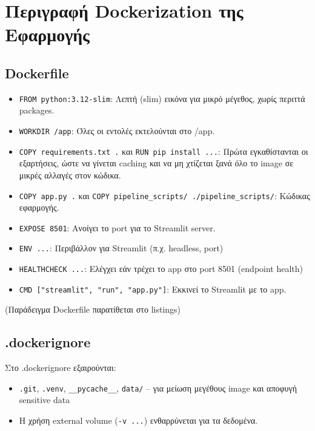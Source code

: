 \documentclass[12pt, a4paper]{article}
\begin{document}
\section{Περιγραφή Dockerization της Εφαρμογής}
\label{sec:dockerization}
\subsection{Dockerfile}
\begin{itemize}
    \item \texttt{FROM python:3.12-slim}: Λεπτή (slim) εικόνα για μικρό μέγεθος, χωρίς περιττά packages.
    \item \texttt{WORKDIR /app}: Όλες οι εντολές εκτελούνται στο /app.
    \item \texttt{COPY requirements.txt .} και \texttt{RUN pip install ...}: Πρώτα εγκαθίστανται οι εξαρτήσεις, ώστε να γίνεται caching και να μη χτίζεται ξανά όλο το image σε μικρές αλλαγές στον κώδικα.
    \item \texttt{COPY app.py .} και \texttt{COPY pipeline\_scripts/ ./pipeline\_scripts/}: Κώδικας εφαρμογής.
    \item \texttt{EXPOSE 8501}: Ανοίγει το port για το Streamlit server.
    \item \texttt{ENV ...}: Περιβάλλον για Streamlit (π.χ. headless, port)
    \item \texttt{HEALTHCHECK ...}: Ελέγχει εάν τρέχει το app στο port 8501 (endpoint health)
    \item \texttt{CMD ["streamlit", "run", "app.py"]}: Εκκινεί το Streamlit με το app.
\end{itemize}

(Παράδειγμα Dockerfile παρατίθεται στο listings)

\subsection{.dockerignore}
Στο .dockerignore εξαιρούνται:
\begin{itemize}
    \item \texttt{.git}, \texttt{.venv}, \texttt{\_\_pycache\_\_}, \texttt{data/} -- για μείωση μεγέθους image και αποφυγή sensitive data
    \item Η χρήση external volume (\texttt{-v ...}) ενθαρρύνεται για τα δεδομένα.
\end{itemize}
\end{document}
